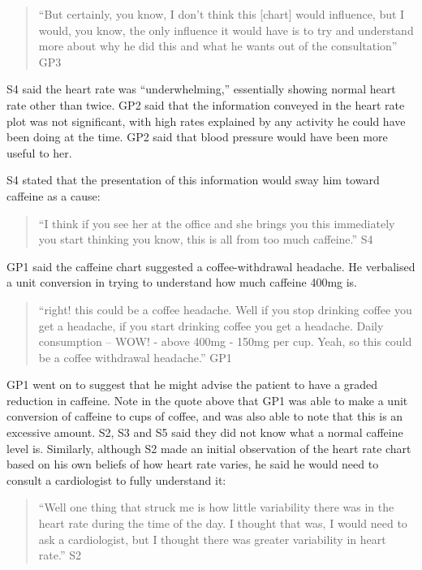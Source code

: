 \documentclass{sigchi}
\begin{document}
\begin{quote}
    ``But certainly, you know, I don't think this [chart] would influence, but I would, you know, the only influence it would have is to try and understand more about why he did this and what he wants out of the consultation'' GP3
\end{quote}

S4 said the heart rate was ``underwhelming,'' essentially showing normal heart rate other than twice. GP2 said that the information conveyed in the heart rate plot was not significant, with high rates explained by any activity he could have been doing at the time. GP2 said that blood pressure would have been more useful to her.

S4 stated that the presentation of this information would sway him toward caffeine as a cause:

\begin{quote}
    ``I think if you see her at the office and she brings you this immediately you start thinking you know, this is all from too much caffeine.'' S4
\end{quote}

GP1 said the caffeine chart suggested a coffee-withdrawal headache. He verbalised a unit conversion in trying to understand how much caffeine 400mg is.

\begin{quote}
    ``right! this could be a coffee headache. Well if you stop drinking coffee you get a headache, if you start drinking coffee you get a headache. Daily consumption -- WOW! - above 400mg - 150mg per cup. Yeah, so this could be a coffee withdrawal headache.'' GP1
\end{quote}

GP1 went on to suggest that he might advise the patient to have a graded reduction in caffeine. Note in the quote above that GP1 was able to make a unit conversion of caffeine to cups of coffee, and was also able to note that this is an excessive amount. S2, S3 and S5 said they did not know what a normal caffeine level is. Similarly, although S2 made an initial observation of the heart rate chart based on his own beliefs of how heart rate varies, he said he would need to consult a cardiologist to fully understand it:

\begin{quote}
    ``Well one thing that struck me is how little variability there was in the heart rate during the time of the day. I thought that was, I would need to ask a cardiologist, but I thought there was greater variability in heart rate.'' S2
\end{quote}
\end{document}
